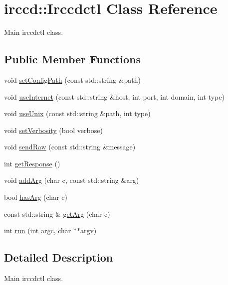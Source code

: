 \hypertarget{a00033}{\section{irccd\-:\-:Irccdctl Class Reference}
\label{a00033}
}


Main irccdctl class.  


\subsection*{Public Member Functions}
\begin{DoxyCompactItemize}
\item 
void \hyperlink{a00033_a3247a5f97528c8c744441ec8266b8ae0}{set\-Config\-Path} (const std\-::string \&path)
\item 
void \hyperlink{a00033_a52b1fbed5eed25a2f1c991470e1c8d26}{use\-Internet} (const std\-::string \&host, int port, int domain, int type)
\item 
void \hyperlink{a00033_a1880ad8764eb2126005ac94e0cfe29f3}{use\-Unix} (const std\-::string \&path, int type)
\item 
void \hyperlink{a00033_a457a45aa77120354f0d7292c0b351e60}{set\-Verbosity} (bool verbose)
\item 
void \hyperlink{a00033_a6bd6abf4e1d3089b2758bc19452076c4}{send\-Raw} (const std\-::string \&message)
\item 
int \hyperlink{a00033_a3a24c190f16cfee4e5430d4dc76bf329}{get\-Response} ()
\item 
void \hyperlink{a00033_a4f741f6b14fe129ab400c9042cc536c6}{add\-Arg} (char c, const std\-::string \&arg)
\item 
bool \hyperlink{a00033_a923c616805d7262f9eafc008cae8828a}{has\-Arg} (char c)
\item 
const std\-::string \& \hyperlink{a00033_a214f3beae1ec4e90d2ed5c31916862b1}{get\-Arg} (char c)
\item 
int \hyperlink{a00033_a03e02da4571194c2937a26d184ae323f}{run} (int argc, char $\ast$$\ast$argv)
\end{DoxyCompactItemize}


\subsection{Detailed Description}
Main irccdctl class. 

